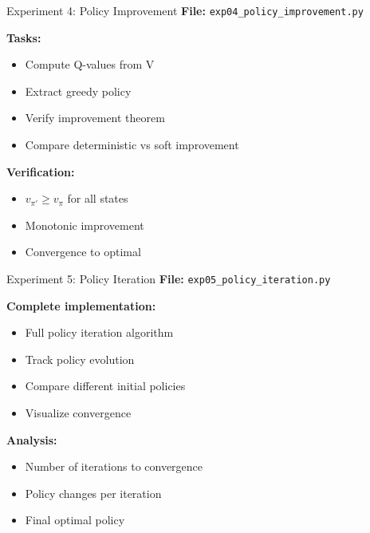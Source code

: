 \documentclass[aspectratio=169,10pt]{beamer}
\begin{document}
\begin{frame}{Experiment 4: Policy Improvement}
\textbf{File:} \texttt{exp04\_policy\_improvement.py}

\textbf{Tasks:}
\begin{itemize}
    \item Compute Q-values from V
    \item Extract greedy policy
    \item Verify improvement theorem
    \item Compare deterministic vs soft improvement
\end{itemize}

\textbf{Verification:}
\begin{itemize}
    \item $v_{\pi'} \geq v_\pi$ for all states
    \item Monotonic improvement
    \item Convergence to optimal
\end{itemize}
\end{frame}

\begin{frame}{Experiment 5: Policy Iteration}
\textbf{File:} \texttt{exp05\_policy\_iteration.py}

\textbf{Complete implementation:}
\begin{itemize}
    \item Full policy iteration algorithm
    \item Track policy evolution
    \item Compare different initial policies
    \item Visualize convergence
\end{itemize}

\textbf{Analysis:}
\begin{itemize}
    \item Number of iterations to convergence
    \item Policy changes per iteration
    \item Final optimal policy
\end{itemize}
\end{frame}
\end{document}
